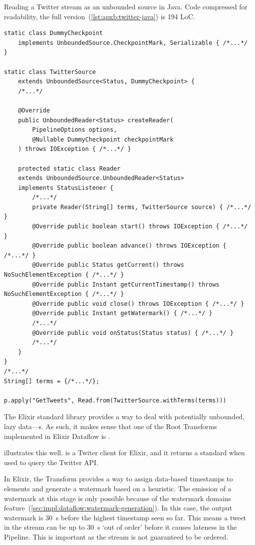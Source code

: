 \begin{codelisting}
	\caption[Reading a Twitter stream as an unbounded source in Java.]{Reading a Twitter stream as an unbounded source in Java. Code compressed for readability, the full version~(\cref{lst:apxb:twitter-java}) is 194 LoC.}
	\label{lst:eval:twitter-readstream-java}
	\begin{verbatim}
static class DummyCheckpoint
    implements UnboundedSource.CheckpointMark, Serializable { /*...*/ }
    
static class TwitterSource
    extends UnboundedSource<Status, DummyCheckpoint> {
    /*...*/
        
    @Override
    public UnboundedReader<Status> createReader(
        PipelineOptions options,
        @Nullable DummyCheckpoint checkpointMark
    ) throws IOException { /*...*/ }

    protected static class Reader
    extends UnboundedSource.UnboundedReader<Status>
    implements StatusListener {
        /*...*/
        private Reader(String[] terms, TwitterSource source) { /*...*/ }
        @Override public boolean start() throws IOException { /*...*/ }
        @Override public boolean advance() throws IOException { /*...*/ }
        @Override public Status getCurrent() throws NoSuchElementException { /*...*/ }
        @Override public Instant getCurrentTimestamp() throws NoSuchElementException { /*...*/ }
        @Override public void close() throws IOException { /*...*/ }
        @Override public Instant getWatermark() { /*...*/ }
        /*...*/
        @Override public void onStatus(Status status) { /*...*/ }
        /*...*/
    }
}
/*...*/
String[] terms = {/*...*/};

p.apply("GetTweets", Read.from(TwitterSource.withTerms(terms)))
	\end{verbatim}
\end{codelisting}

The Elixir standard library provides a way to deal with potentially unbounded, lazy data---s.
As such, it makes sense that one of the Root Transforms implemented in Elixir Dataflow is .

 illustrates this well.
 \cite{ExTwitter} is a Twiter client for Elixir, and it returns a standard  when used to query the Twitter API.

In Elixir, the  Transform provides a way to assign data-based timestamps to elements and generate a watermark based on a heuristic.
The emission of a watermark at this stage is only possible because of the watermark domains feature~(\cref{sec:impl:dataflow:watermark-generation}).
In this case, the output watermark is \SI{30}{\second} before the highest timestamp seen so far.
This means a tweet in the stream can be up to \SI{30}{\second} `out of order' before it causes lateness in the Pipeline.
This is important as the stream is not guaranteed to be ordered.

